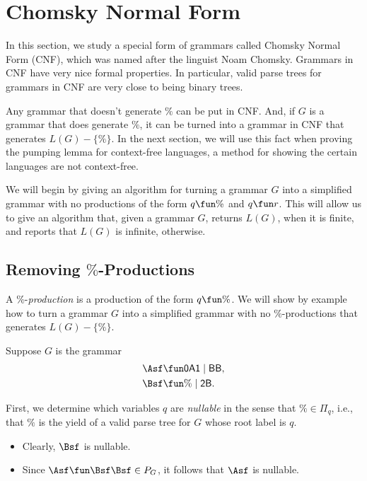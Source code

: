 \section{Chomsky Normal Form}
\label{ChomskyNormalForm}

In this section, we study a special form of grammars called Chomsky
Normal Form (CNF), which was named after the linguist Noam Chomsky.
Grammars in CNF have very nice formal properties.  In particular,
valid parse trees for grammars in CNF are very close to being binary
trees.

Any grammar that doesn't generate $\%$ can be put in CNF.  And, if $G$
is a grammar that does generate $\%$, it can be turned into a grammar
in CNF that generates $L(G)-\{\%\}$.  In the next section, we will use
this fact when proving the pumping lemma for context-free languages, a
method for showing the certain languages are not context-free.

We will begin by giving an algorithm for turning a grammar $G$ into a
simplified grammar with no productions of the form $q\fun\%$ and
$q\fun r$.  This will allow us to give an algorithm that, given
a grammar $G$, returns $L(G)$, when it is finite, and reports that
$L(G)$ is infinite, otherwise.

\subsection{Removing $\%$-Productions}

A $\%$-\emph{production} is a production of the form $q\fun\%$.  We
will show by example how to turn a grammar $G$ into a simplified
grammar with no $\%$-productions that generates $L(G)-\{\%\}$.

Suppose $G$ is the grammar
\begin{align*}
\Asf &\fun \mathsf{0A1} \mid \mathsf{BB} , \\
\Bsf &\fun \% \mid \mathsf{2B} .
\end{align*}

First, we determine which variables $q$ are \emph{nullable} in the
sense that $\%\in\Pi_q$, i.e., that $\%$ is the yield of a valid parse
tree for $G$ whose root label is $q$.
\begin{itemize}
\item Clearly, $\Bsf$ is nullable.

\item Since $\Asf\fun\Bsf\Bsf\in P_G$, it follows that $\Asf$ is
  nullable.
\end{itemize}

